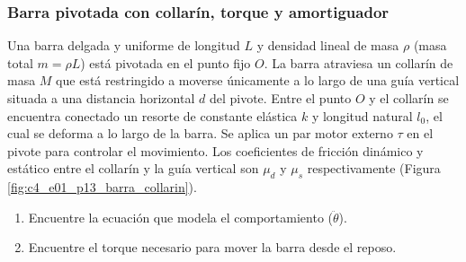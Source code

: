 \subsubsection{Barra pivotada con collarín, torque y amortiguador}

Una barra delgada y uniforme de longitud $L$ y densidad lineal de masa $\rho$ (masa total
$m = \rho L$) está pivotada en el punto fijo $O$. La barra atraviesa un collarín de masa $M$ que
está restringido a moverse únicamente a lo largo de una guía vertical situada a una distancia
horizontal $d$ del pivote. Entre el punto $O$ y el collarín se encuentra conectado un resorte de
constante elástica $k$ y longitud natural $l_0$, el cual se deforma a lo largo de la barra. Se
aplica un par motor externo $\tau$ en el pivote para controlar el movimiento. Los coeficientes de
fricción dinámico y estático entre el collarín y la guía vertical son $\mu_d$ y $\mu_s$
respectivamente (Figura \ref{fig:c4_e01_p13_barra_collarin}).

\begin{enumerate}
    \item Encuentre la ecuación que modela el comportamiento ($\ddot \theta$).
    \item Encuentre el torque necesario para mover la barra desde el reposo.
\end{enumerate}

